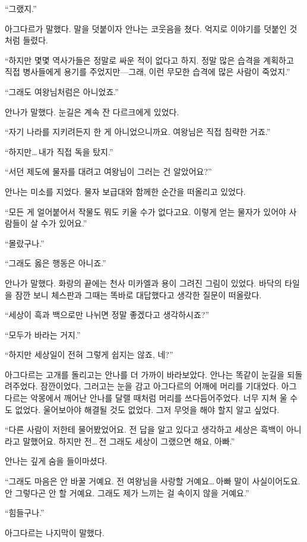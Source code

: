 ``그랬지.''

아그다르가 말했다. 말을 덧붙이자 안나는 코웃음을 쳤다. 억지로 이야기를 덧붙인 것처럼 들렸다.

``하지만 몇몇 역사가들은 정말로 싸운 적이 없다고 하지. 정말 많은 습격을 계획하고 직접 병사들에게 용기를 주었지만—그래, 이런 무모한 습격에 많은 사람이 죽었지.''

``그래도 여왕님처럼은 아니었죠.''

안나가 말했다. 눈길은 계속 잔 다르크에게 있었다.

``자기 나라를 지키려든지 한 게 아니었으니까요. 여왕님은 직접 침략한 거죠.''

``하지만\ldots\,내가 직접 독을 탔지.''

``서던 제도에 물자를 대려고 여왕님이 그러는 건 알았어요?''

안나는 미소를 지었다. 물자 보급대와 함께한 순간을 떠올리고 있었다.

``모든 게 얼어붙어서 작물도 뭐도 키울 수가 없다고요. 이렇게 얻는 물자가 있어야 사람들이 살 수가 있어요.''

`` 몰랐구나.''

``그래도 옳은 행동은 아니죠.''

안나가 말했다. 화랑의 끝에는 천사 미카엘과 용이 그려진 그림이 있었다. 바닥의 타일을 잠깐 보니 체스판과 그때는 똑바로 대답했다고 생각한 질문이 떠올랐다.

``세상이 흑과 백으로만 나뉘면 정말 좋겠다고 생각하시죠?''

``모두가 바라는 거지.''

``하지만 세상일이 전혀 그렇게 쉽지는 않죠, 네?''

아그다르는 고개를 돌리고는 안나를 더 가까이 바라보았다. 안나는 똑같이 눈길을 되돌려주었다. 잠깐이었다, 그러고는 눈을 감고 아그다르의 어깨에 머리를 기대었다. 아그다르는 악몽에서 깨어난 안나를 달랠 때처럼 머리를 쓰다듬어주었다. 너무 지쳐 울 수도 없었다. 울어보아야 해결될 것도 없었다. 그저 무엇을 해야 할지 알고 싶었다.

``다른 사람이 저한테 물어봤었어요. 전 답을 알고 있다고 생각하고 세상은 흑백이 아니라고 말했어요. 하지만 전\ldots\,전 그래도 세상이 그랬으면 해요, 아빠.''

안나는 깊게 숨을 들이마셨다.

``그래도 마음은 안 바꿀 거예요. 전 여왕님을 사랑할 거예요\ldots\,아빠 말이 사실이어도요. 안 그렇다곤 안 할 거예요. 그래도 제가 느끼는 걸 속이지 않을 거예요.''

`` 힘들구나.''

아그다르는 나지막이 말했다.

